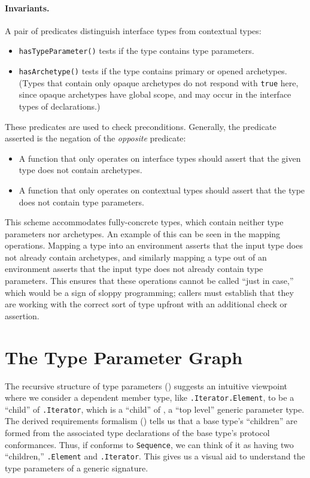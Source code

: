 \documentclass[../generics]{subfiles}
\begin{document}
\paragraph{Invariants.} A pair of predicates distinguish interface types from contextual types:
\begin{itemize}
\item \texttt{hasTypeParameter()} tests if the type contains type parameters.
\item \texttt{hasArchetype()} tests if the type contains primary or opened archetypes. (Types that contain only opaque archetypes do not respond with \texttt{true} here, since opaque archetypes have global scope, and may occur in the interface types of declarations.)
\end{itemize}
These predicates are used to check preconditions. Generally, the predicate asserted is the negation of the \emph{opposite} predicate:
\begin{itemize}
\item A function that only operates on interface types should assert that the given type does not contain archetypes.
\item A function that only operates on contextual types should assert that the type does not contain type parameters.
\end{itemize}
This scheme accommodates fully-concrete types, which contain neither type parameters nor archetypes. An example of this can be seen in the mapping operations. Mapping a type into an environment asserts that the input type does not already contain archetypes, and similarly mapping a type out of an environment asserts that the input type does not already contain type parameters. This ensures that these operations cannot be called ``just in case,'' which would be a sign of sloppy programming; callers must establish that they are working with the correct sort of type upfront with an additional check or assertion.

\section{The Type Parameter Graph}\label{type parameter graph}

The recursive structure of type parameters () suggests an intuitive viewpoint where we consider a dependent member type, like \texttt{.Iterator.Element}, to be a ``child'' of \texttt{.Iterator}, which is a ``child'' of , a ``top level'' generic parameter type. The derived requirements formalism () tells us that a base type's ``children'' are formed from the associated type declarations of the base type's protocol conformances. Thus, if  conforms to \texttt{Sequence}, we can think of it as having two ``children,'' \texttt{.Element} and \texttt{.Iterator}. This gives us a visual aid to understand the type parameters of a generic signature.
\end{document}
